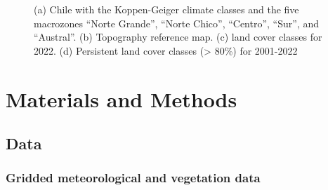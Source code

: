 \documentclass[
  authoryear,
  preprint,
  3p,
  onecolumn]{elsarticle}
\begin{document}
\begin{figure}[!ht]


\caption{\label{fig-studyArea}(a) Chile with the Koppen-Geiger climate
classes and the five macrozones ``Norte Grande'', ``Norte Chico'',
``Centro'', ``Sur'', and ``Austral''. (b) Topography reference map. (c)
land cover classes for 2022. (d) Persistent land cover classes
(\textgreater{} 80\%) for 2001-2022}

\end{figure}%

\section{Materials and Methods}\label{materials-and-methods}

\subsection{Data}\label{data}

\subsubsection{Gridded meteorological and vegetation
data}\label{gridded-meteorological-and-vegetation-data}
\end{document}
